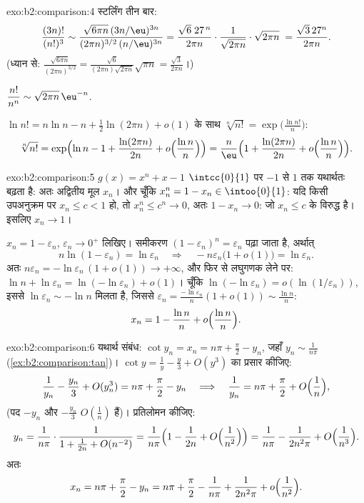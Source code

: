 \begin{solution}{exo:b2:comparison:4}
स्टर्लिंग तीन बार:
\[
\frac{(3n)!}{(n!)^3}
\sim \frac{\sqrt{6\pi n}\,(3n/\eu)^{3n}}
{(2\pi n)^{3/2}\,(n/\eu)^{3n}}
= \frac{\sqrt{6}\; 27^{\,n}}{2\pi n} \cdot
\frac{1}{\sqrt{2\pi n}}\cdot\sqrt{2\pi n}\;
= \frac{\sqrt3\,27^n}{2\pi n} .
\]
(ध्यान से: $\frac{\sqrt{6\pi n}}{(2\pi n)^{3/2}} =
\frac{\sqrt6}{(2\pi n)\sqrt{2\pi n}}\sqrt{\pi n} =
\frac{\sqrt3}{2\pi n}$।)

$\dfrac{n!}{n^n} \sim \sqrt{2\pi n}\,\eu^{-n}$.

$\ln n! = n\ln
n - n + \frac12\ln(2\pi n) + o(1)$ के साथ $\sqrt[n]{n!} = \exp\bigl(\frac{\ln n!}{n}\bigr)$:
\[
\sqrt[n]{n!} = \exp\Bigl(\ln n - 1 + \frac{\ln(2\pi n)}{2n} +
o\Bigl(\frac{\ln n}{n}\Bigr)\Bigr)
= \frac{n}{\eu}\Bigl(1 + \frac{\ln(2\pi n)}{2n} +
o\Bigl(\frac{\ln n}{n}\Bigr)\Bigr).
\]
\end{solution}

\begin{solution}{exo:b2:comparison:5}
$g(x) = x^n + x - 1$ $\intcc{0}{1}$ पर $-1$ से $1$ तक यथार्थतः बढ़ता है: अतः अद्वितीय मूल $x_n$। और
चूँकि $x_n^n = 1 - x_n \in
\intoo{0}{1}$: यदि किसी उपअनुक्रम पर $x_n \leq c < 1$ हो, तो $x_n^n
\leq c^n \to 0$, अतः $1 - x_n \to 0$: जो $x_n \leq
c$ के
विरुद्ध है। इसलिए $x_n \to 1$।

$x_n = 1 - \varepsilon_n$, $\varepsilon_n \to 0^+$ लिखिए। समीकरण $(1 - \varepsilon_n)^n = \varepsilon_n$ पढ़ा जाता है, अर्थात्
\[
n\ln(1 - \varepsilon_n) = \ln \varepsilon_n
\quad\Longrightarrow\quad
-n\varepsilon_n\bigl(1 + o(1)\bigr) = \ln\varepsilon_n .
\]
अतः $n\varepsilon_n = -\ln\varepsilon_n\,(1 + o(1)) \to +\infty$, और फिर से लघुगणक लेने पर: $\ln n + \ln\varepsilon_n =
\ln(-\ln\varepsilon_n) + o(1)$। चूँकि $\ln(-\ln \varepsilon_n) =
o(\ln(1/\varepsilon_n))$, इससे $\ln\varepsilon_n \sim -\ln
n$ मिलता है,
जिससे $\varepsilon_n = \frac{-\ln\varepsilon_n}{n}(1 + o(1))
\sim \frac{\ln n}{n}$:
\[
x_n = 1 - \frac{\ln n}{n} + o\Bigl(\frac{\ln n}{n}\Bigr) .
\]
\end{solution}

\begin{solution}{exo:b2:comparison:6}
यथार्थ संबंध: $\cot y_n = x_n = n\pi + \frac\pi2 - y_n$, जहाँ $y_n
\sim \frac{1}{n\pi}$ (\cref{ex:b2:comparison:tan})। $\cot y
= \frac1y - \frac y3 + O(y^3)$ का प्रसार कीजिए:
\[
\frac{1}{y_n} - \frac{y_n}{3} + O(y_n^3) = n\pi + \frac\pi2 - y_n
\quad\Longrightarrow\quad
\frac{1}{y_n} = n\pi + \frac\pi2 + O\Bigl(\frac1n\Bigr),
\]
(पद $-y_n$ और $-\frac{y_n}{3}$ $O(\frac1n)$ हैं)। प्रतिलोमन कीजिए:
\[
y_n = \frac{1}{n\pi}\cdot\frac{1}{1 + \frac{1}{2n} + O(n^{-2})}
= \frac{1}{n\pi}\Bigl(1 - \frac{1}{2n} + O\Bigl(\frac{1}{n^2}\Bigr)\Bigr)
= \frac{1}{n\pi} - \frac{1}{2n^2\pi} + O\Bigl(\frac{1}{n^3}\Bigr).
\]
अतः
\[
x_n = n\pi + \frac{\pi}{2} - y_n
= n\pi + \frac\pi2 - \frac{1}{n\pi} + \frac{1}{2n^2\pi} +
o\Bigl(\frac{1}{n^2}\Bigr).
\]
\end{solution}


